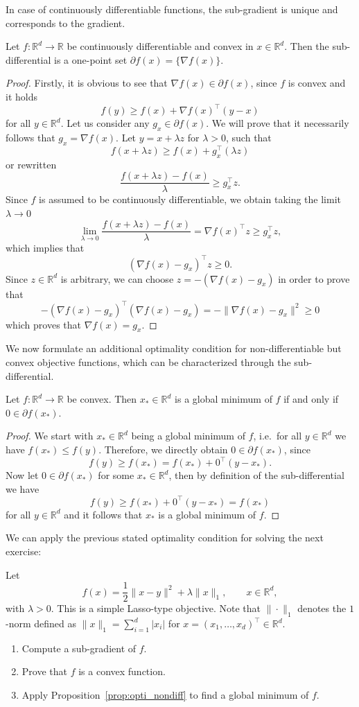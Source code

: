 \documentclass[12pt,openany]{book}
\theoremstyle{definition}
\theoremstyle{definition}
\newcommand{\R}{\mathbb{R}}
\begin{document}
In case of continuously differentiable functions, the sub-gradient is unique and corresponds to the gradient. 
\begin{prop}
Let $f:\R^d\to\R$ be continuously differentiable and convex in $x\in\R^d$. Then the sub-differential is a one-point set $\partial f(x) = \{\nabla f(x)\}$.
\end{prop}
\begin{proof}
Firstly, it is obvious to see that $\nabla f(x)\in\partial f(x)$, since $f$ is convex and it holds
\[f(y)\ge f(x) + \nabla f(x)^\top(y-x)\]
for all $y\in\R^d$.
Let us consider any $g_x\in\partial f(x)$. We will prove that it necessarily follows that $g_x=\nabla f(x)$.  Let $y = x+\lambda z$ for $\lambda>0$, such that 
\[f(x+\lambda z) \ge f(x)+g_x^\top (\lambda z)\]
or rewritten
\[\frac{f(x+\lambda z) - f(x)}{\lambda} \ge g_x^\top z. \]
Since $f$ is assumed to be continuously differentiable, we obtain taking the limit $\lambda\to0$
\[\lim_{\lambda\to0} \frac{f(x+\lambda z) - f(x)}{\lambda} = \nabla f(x)^\top z \ge g_x^\top z, \]
which implies that
\[(\nabla f(x) - g_x)^\top z \ge 0. \]
Since $z\in\R^d$ is arbitrary, we can choose $z=-(\nabla f(x)-g_x)$ in order to prove that
\[-(\nabla f(x)-g_x)^\top (\nabla f(x) - g_x) = - \|\nabla f(x)-g_x\|^2\ge0 \]
which proves that $\nabla f(x) = g_x$. 
\end{proof}

We now formulate an additional optimality condition for non-differentiable but convex objective functions, which can be characterized through the sub-differential.
\begin{prop}\label{prop:opti_nondiff}
Let $f:\R^d\to\R$ be convex. Then $x_\ast\in\R^d$ is a global minimum of $f$ if and only if $0\in\partial f(x_\ast)$.
\end{prop}
\begin{proof}
We start with $x_\ast\in\R^d$ being a global minimum of $f$, i.e.~for all $y\in\R^d$ we have $f(x_\ast)\le f(y)$. Therefore, we directly obtain $0\in\partial f(x_\ast)$, since 
\[f(y) \ge f(x_\ast)=f(x_\ast) + 0^\top (y-x_\ast). \]
Now let $0\in\partial f(x_\ast)$ for some $x_\ast\in\R^d$, then by definition of the sub-differential we have
\[f(y) \ge f(x_\ast) + 0^\top (y-x_\ast) = f(x_\ast) \]
for all $y\in\R^d$ and it follows that $x_\ast$ is a global minimum of $f$.
\end{proof}

We can apply the previous stated optimality condition for solving the next exercise:
\begin{exercise}
Let
\[
f(x)=\frac12\|x-y\|^2+\lambda\|x\|_1,\qquad x\in\R^d,
\]
with $\lambda>0$. This is a simple Lasso-type objective.  Note that $\|\cdot\|_1$ denotes the $1$-norm defined as $\|x\|_1 = \sum_{i=1}^d|x_i|$ for $x=(x_1,\dots,x_d)^\top\in\R^d$. 
\begin{enumerate}
\item Compute a sub-gradient of $f$.
\item Prove that $f$ is a convex function.
\item Apply Proposition~\ref{prop:opti_nondiff} to find a global minimum of $f$.
\end{enumerate}
\end{exercise}
\end{document}
